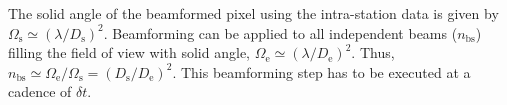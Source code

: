 \documentclass[
  journal=pasa,
  manuscript=article-type,
  year=2020,
  volume=37,
]{cup-journal}
\begin{document}
The solid angle of the beamformed pixel using the intra-station data is given by $\Omega_\textrm{s} \simeq (\lambda/D_\textrm{s})^2$. Beamforming can be applied to all independent beams ($n_\textrm{bs}$) filling the field of view with solid angle, $\Omega_\textrm{e} \simeq (\lambda/D_\textrm{e})^2$. Thus, $n_\textrm{bs} \simeq \Omega_\textrm{e}/\Omega_\textrm{s}=(D_\textrm{s}/D_\textrm{e})^2$. This beamforming step has to be executed at a cadence of $\delta t$. 



\end{document}
